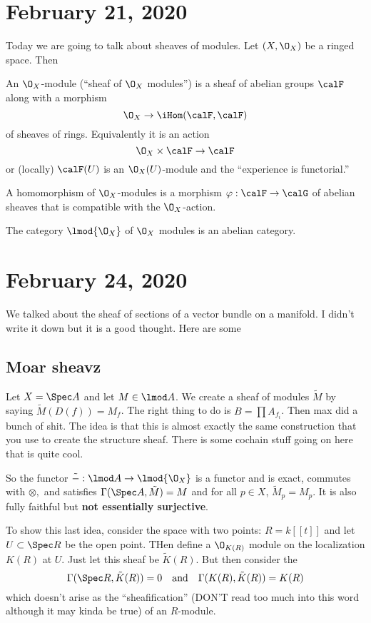 \documentclass[12pt]{article}
\begin{document}
\section{February 21, 2020}
Today we are going to talk about sheaves of modules. Let $(X,\O_X)$ be a ringed space. Then 
\begin{defn}
	An $\O_X$-module (``sheaf of $\O_X$ modules'') is a sheaf of abelian groups $\calF$ along with a morphism 
	\[\O_X\to \iHom(\calF,\calF)\]
	of sheaves of rings. Equivalently it is an action 
	\[\O_X\times\calF\to \calF\]
	or (locally) $\calF(U)$ is an $\O_X(U)$-module and the ``experience is functorial.''

	A homomorphism of $\O_X$-modules is a morphism $\varphi:\calF\to\calG$ of abelian sheaves that is compatible with the $\O_X$-action.
\end{defn}
\begin{lem}
	The category $\lmod{\O_X}$ of $\O_X$ modules is an abelian category.
\end{lem}

\section{February 24, 2020}
We talked about the sheaf of sections of a vector bundle on a manifold. I didn't write it down but it is a good thought.
Here are some 

\subsection{Moar sheavz}
Let $X=\Spec A$ and let $M\in \lmod A$. We create a sheaf of modules $\tilde M$ by saying $\tilde M(D(f))=M_f$. 
The right thing to do is $B=\prod A_{f_i}$. Then max did a bunch of shit. The idea is that this is almost exactly the 
same construction that you use to create the structure sheaf. There is some cochain stuff going on here that is quite cool. 

So the functor $\tilde -:\lmod A\to \lmod{\O_X}$ is a functor and is exact, commutes with $\otimes,$ and satisfies $\Gamma(\Spec A,\tilde M)=M$ and 
for all $p\in X$, $\tilde M_p=M_p$. It is also fully faithful but \textbf{not essentially surjective}.

To show this last idea, consider the space with two points: $R= k[[t]]$ and let $U\subset\Spec R$ be the open point. THen define 
a $\O_{K(R)}$ module on the localization $K(R)$ at $U$. Just let this sheaf be $\tilde K(R)$. But then consider the 
\[\Gamma(\Spec R,\tilde K(R))=0\quad\text{and}\quad\Gamma(K(R),\tilde K(R))=K(R)\]
which doesn't arise as the ``sheafification'' (DON'T read too much into this word although it may kinda be true) of an $R$-module.
\end{document}
